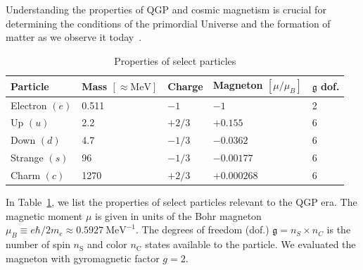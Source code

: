 \documentclass[epjST]{svjour}
\begin{document}
Understanding the properties of QGP and cosmic magnetism is crucial for determining the conditions of the primordial Universe and the formation of matter as we observe it today~\cite{Uzan:2010pm,Uzan:2024ded,Grasso:2000wj,Widrow:2002ud,Kandus:2010nw,Ghosh:2024owm}.
\begin{table}[h]
    \centering
    \caption{Properties of select particles}
    \label{tab:particle_properties}
    \begin{tabular}{@{}lllll@{}}
        \toprule
        \textbf{Particle} & \textbf{Mass} \([\approx\mathrm{MeV}]\) & \textbf{Charge} & \textbf{Magneton} \([\mu/\mu_{B}]\) & \(\mathfrak{g}\) \textbf{dof.} \\ 
        \midrule
        Electron    \((e)\) & 0.511 & \(-1\)    & \(-1\)         & 2 \\
        Up          \((u)\) & 2.2   & \(+2/3\)  & \(+0.155\)     & 6 \\
        Down        \((d)\) & 4.7   & \(-1/3\)  & \(-0.0362\)    & 6 \\
        Strange     \((s)\) & 96    & \(-1/3\)  & \(-0.00177\)   & 6 \\
        Charm       \((c)\) & 1270  & \(+2/3\)  & \(+0.000268\)  & 6 \\ 
        \bottomrule
    \end{tabular}
\end{table}
In Table~\ref{tab:particle_properties}, we list the properties of select particles relevant to the QGP era. The magnetic moment \(\mu\) is given in units of the Bohr magneton \(\mu_{B}\equiv e\hbar/2m_{e}\approx0.5927\ \mathrm{MeV}^{-1}\). The degrees of freedom (dof.) \(\mathfrak{g}=n_{S}\times n_{C}\) is the number of spin \(n_\mathrm{S}\) and color \(n_\mathrm{C}\) states available to the particle. We evaluated the magneton with gyromagnetic factor \(g=2\).
\end{document}
